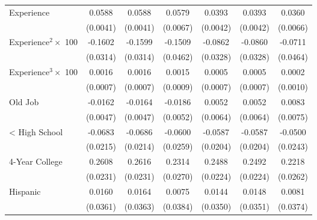 {\begin{longtable}{l*{6}{c}}
Experience          &      0.0588\sym{***}&      0.0588\sym{***}&      0.0579\sym{***}&      0.0393\sym{***}&      0.0393\sym{***}&      0.0360\sym{***}\\
                    &    (0.0041)         &    (0.0041)         &    (0.0067)         &    (0.0042)         &    (0.0042)         &    (0.0066)         \\
Experience$^2\times$ 100&     -0.1602\sym{***}&     -0.1599\sym{***}&     -0.1509\sym{***}&     -0.0862\sym{***}&     -0.0860\sym{***}&     -0.0711         \\
                    &    (0.0314)         &    (0.0314)         &    (0.0462)         &    (0.0328)         &    (0.0328)         &    (0.0464)         \\
Experience$^3\times$ 100&      0.0016\sym{**} &      0.0016\sym{**} &      0.0015         &      0.0005         &      0.0005         &      0.0002         \\
                    &    (0.0007)         &    (0.0007)         &    (0.0009)         &    (0.0007)         &    (0.0007)         &    (0.0010)         \\
Old Job             &     -0.0162\sym{***}&     -0.0164\sym{***}&     -0.0186\sym{***}&      0.0052         &      0.0052         &      0.0083         \\
                    &    (0.0047)         &    (0.0047)         &    (0.0052)         &    (0.0064)         &    (0.0064)         &    (0.0075)         \\
< High School       &     -0.0683\sym{***}&     -0.0686\sym{***}&     -0.0600\sym{**} &     -0.0587\sym{***}&     -0.0587\sym{***}&     -0.0500\sym{**} \\
                    &    (0.0215)         &    (0.0214)         &    (0.0259)         &    (0.0204)         &    (0.0204)         &    (0.0243)         \\
4-Year College      &      0.2608\sym{***}&      0.2616\sym{***}&      0.2314\sym{***}&      0.2488\sym{***}&      0.2492\sym{***}&      0.2218\sym{***}\\
                    &    (0.0231)         &    (0.0231)         &    (0.0270)         &    (0.0224)         &    (0.0224)         &    (0.0262)         \\
Hispanic            &      0.0160         &      0.0164         &      0.0075         &      0.0144         &      0.0148         &      0.0081         \\
                    &    (0.0361)         &    (0.0363)         &    (0.0384)         &    (0.0350)         &    (0.0351)         &    (0.0374)         \\

\end{longtable}}
